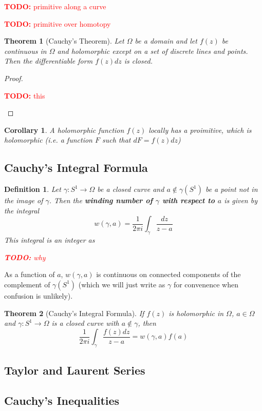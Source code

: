 \documentclass{article}
\newtheorem{theorem}{Theorem}
\newtheorem{corollary}{Corollary}
\newtheorem{definition}{Definition}
\newcommand{\TODO}[1]{\begin{center}\huge{\textcolor{red}{\textbf{TODO:} #1}}\end{center}}
\begin{document}
\TODO{primitive along a curve}

\TODO{primitive over homotopy}

\begin{theorem}[Cauchy's Theorem]
Let \(\Omega\) be a domain and let \(f(z)\) be continuous in \(\Omega\) and holomorphic except on a set of discrete lines and points. Then the differentiable form \(f(z)dz\) is closed.
\end{theorem}
\begin{proof}
\TODO{this}
\end{proof}

\begin{corollary}
A holomorphic function \(f(z)\) locally has a proimitive, which is holomorphic (i.e. a function \(F\) such that \(dF = f(z)dz\))
\end{corollary}

\subsection{Cauchy's Integral Formula}

\begin{definition}
Let \(\gamma: S^1 \to \Omega\) be a closed curve and \(a \notin \gamma(S^1)\) be a point not in the image of \(\gamma\). Then the \textbf{winding number of \(\gamma\) with respect to \(a\)} is given by the integral
\[w(\gamma, a) = \frac{1}{2\pi i}\int_\gamma\frac{dz}{z - a}\]
This integral is an integer as
\TODO{why}
\end{definition}
As a function of \(a\), \(w(\gamma, a)\) is continuous on connected components of the complement of \(\gamma(S^1)\) (which we will just write as \(\gamma\) for convenence when confusion is unlikely).

\begin{theorem}[Cauchy's Integral Formula]
If \(f(z)\) is holomorphic in \(\Omega\), \(a \in \Omega\) and \(\gamma: S^1 \to \Omega\) is a closed curve with \(a \notin \gamma\), then
\[\frac{1}{2\pi i}\int_\gamma\frac{f(z)dz}{z - a} = w(\gamma, a)f(a)\]
\end{theorem}

\subsection{Taylor and Laurent Series}

\subsection{Cauchy's Inequalities}
\end{document}
